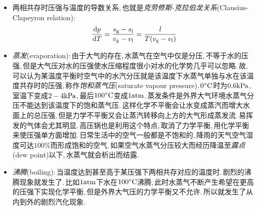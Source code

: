 	\begin{itemize}
	\item 两相共存时压强与温度的导数关系,\,也就是\emph{克劳修斯-克拉伯龙关系}(Clausius-Clapeyron relation):
	\[\frac{\textrm{d} p}{\textrm{d} T}=\frac{s_{\rm g}-s_{\rm l}}{v_{\rm g}-v_{\rm l}}=\frac{l}{T(v_{\rm g}-v_{\rm l})}\]
	
	\item \emph{蒸发}(evaporation):\,由于大气的存在,\,水蒸气在空气中仅是分压,\,不等于水的压强,\,但是大气压对水的压强使水压缩程度很小对水的化学势几乎可以忽略.\,故,\,可以认为某温度平衡时空气中的水汽分压就是该温度下水蒸气单独与水在该温度共存时的压强,\,称作\emph{饱和蒸气压}(saturate vapour pressure).\,$0^\circ \mathrm{C}$时为$0.6{\rm kPa}$,\,室温下变成$2-4{\rm kPa}$,\,最后$100^\circ \mathrm{C}$变成$1{\rm atm}$.\,蒸发条件是外界大气环境水蒸气分压不能达到该温度下的饱和蒸气压.\,这样化学不平衡会让水变成蒸汽而增大水面上的总压强,\,但是力学不平衡又会让蒸汽转移向上方的大气形成蒸发流.\,易挥发的气体会尤其明显.\,高压锅也是利用这个特点,\,取消了力学平衡,\,用化学平衡来使压强单方面增加.\,日常生活中的空气一般都是不饱和的,\,降雨的天气空气湿度可达$100\%$而形成饱和的空气.\,如果空气水蒸气分压较大而经历降温至\emph{露点}(dew point)以下,\,水蒸气就会析出而结露.

	\item \emph{沸腾}(boiling):\,当温度达到甚至高于某压强下两相共存对应的温度时.\,剧烈的沸腾现象就发生了.\,比如$1{\rm atm}$下水在$100^\circ \mathrm{C}$沸腾,\,此时水蒸气不断产生希望在更高的压强下实现化学平衡,\,但是外界大气压的力学平衡又不允许.\,所以就发生了从内到外的剧烈汽化现象.
\end{itemize}


